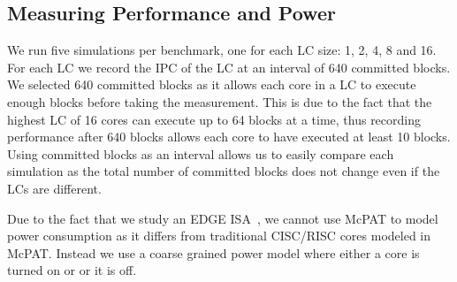 \subsection{Measuring Performance and Power}

We run five simulations per benchmark, one for each LC size: 1, 2, 4, 8 and 16.
For each LC we record the IPC of the LC at an interval of 640 committed blocks.
We selected 640 committed blocks as it allows each core in a LC to execute enough blocks before taking the measurement.
This is due to the fact that the highest LC of 16 cores can execute up to 64 blocks at a time, thus recording performance after 640 blocks allows each core to have executed at least 10 blocks.
Using committed blocks as an interval allows us to easily compare each simulation as the total number of committed blocks does not change even if the LCs are different.

Due to the fact that we study an EDGE ISA~\cite{smith2006edge}, we cannot use McPAT to model power consumption as it differs from traditional CISC/RISC cores modeled in McPAT.
Instead we use a coarse grained power model where either a core is turned on or or it is off. 
